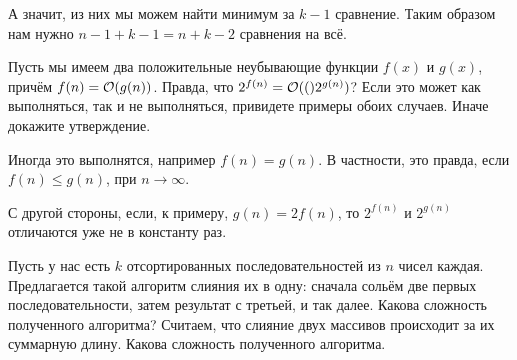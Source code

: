 \documentclass[addpoints]{exam}
\begin{document}
\begin{questions}
\begin{solution}
\begin{center}
\end{center}

А значит, из них мы можем найти минимум за $k-1$ сравнение. Таким образом нам нужно $n-1+k-1=n+k-2$ сравнения на всё.

\end{solution}

\question[1] Пусть мы имеем два положительные неубывающие функции $f(x)$ и $g(x)$, причём $f(n) = \mathcal{O}(g(n))$. Правда, что $2^{f(n)} = \mathcal{O}(()2^{g(n)})$? Если это может как выполняться, так и не выполняться, привидете примеры обоих случаев. Иначе докажите утверждение.

\begin{solution}

Иногда это выполнятся, например $f(n) = g(n)$. В частности, это правда, если $f(n) \leqslant g(n)$, при $n \to \infty$.

С другой стороны, если, к примеру, $g(n) = 2f(n)$, то $2^{f(n)}$ и $2^{g(n)}$ отличаются уже не в константу раз.

\end{solution}

\question[\half] Пусть у нас есть $k$ отсортированных последовательностей из $n$ чисел каждая. Предлагается такой алгоритм слияния их в одну: сначала сольём две первых последовательности, затем результат с третьей, и так далее. Какова сложность полученного алгоритма? Считаем, что слияние двух массивов происходит за их суммарную длину. Какова сложность полученного алгоритма.

\begin{solution}


\end{solution}
\end{questions}
\end{document}
